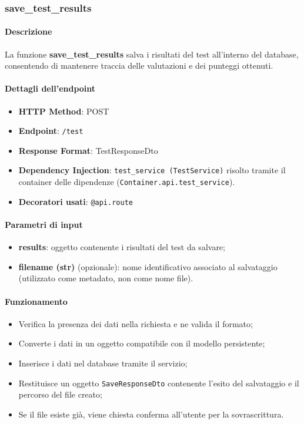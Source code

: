 \subsubsection{save\_test\_results}
\label{subsubsec:savetestresults}

\paragraph{Descrizione}
La funzione \textbf{save\_test\_results} salva i risultati del test all'interno del database, consentendo di mantenere traccia delle valutazioni e dei punteggi ottenuti.

\paragraph{Dettagli dell'endpoint}
\begin{itemize}
    \item \textbf{HTTP Method}: POST
    \item \textbf{Endpoint}: \texttt{/test}
    \item \textbf{Response Format}: TestResponseDto
    \item \textbf{Dependency Injection}: \texttt{test\_service (TestService)} risolto tramite il container delle dipendenze (\texttt{Container.api.test\_service}).
    \item \textbf{Decoratori usati}: \texttt{@api.route}
\end{itemize}

\paragraph{Parametri di input}
\begin{itemize}
    \item \textbf{results}: oggetto contenente i risultati del test da salvare;
    \item \textbf{filename (str)} (opzionale): nome identificativo associato al salvataggio (utilizzato come metadato, non come nome file).
\end{itemize}

\paragraph{Funzionamento}
\begin{itemize}
    \item Verifica la presenza dei dati nella richiesta e ne valida il formato;
    \item Converte i dati in un oggetto compatibile con il modello persistente;
    \item Inserisce i dati nel database tramite il servizio;
    \item Restituisce un oggetto \texttt{SaveResponseDto} contenente l'esito del salvataggio e il percorso del file creato;
    \item Se il file esiste già, viene chiesta conferma all'utente per la sovrascrittura.
\end{itemize}

